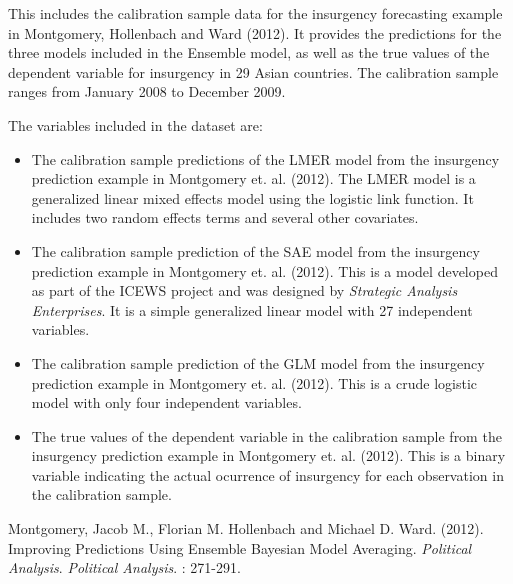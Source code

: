 \documentclass[a4paper]{book}
\begin{document}
%
\begin{Description}\relax
This includes the calibration sample data for the insurgency forecasting example in Montgomery, Hollenbach and Ward (2012). It provides the predictions for the three models included in the Ensemble model, as well as the true values of the dependent variable for insurgency in 29 Asian countries. The calibration sample ranges from January 2008 to December 2009.
\end{Description}
%
\begin{Details}\relax
The variables included in the dataset are:
\begin{itemize}

\item {} The calibration sample predictions of the LMER model from the insurgency prediction example in Montgomery et. al. (2012). The LMER model is a generalized linear mixed effects model using the logistic link function. It includes two random effects terms and several other covariates.
\item {} The calibration sample prediction of the SAE model from the insurgency prediction example in Montgomery et. al. (2012). This is a model developed as part of the ICEWS project and was designed by \emph{Strategic Analysis Enterprises}. It is a simple generalized linear model with 27 independent variables.
\item {} The calibration sample prediction of the GLM model from the insurgency prediction example in Montgomery et. al. (2012). This is a crude logistic model with only four independent variables.
\item {} The true values of the dependent variable in the calibration sample from the insurgency prediction example in Montgomery et. al. (2012). This is a binary variable indicating the actual ocurrence of insurgency for each observation in the calibration sample.

\end{itemize}

\end{Details}
%
\begin{References}\relax
Montgomery, Jacob M., Florian M. Hollenbach and Michael D. Ward. (2012). Improving Predictions Using Ensemble Bayesian Model Averaging. \emph{Political Analysis}. \emph{Political Analysis}. : 271-291.
\end{References}
\end{document}
